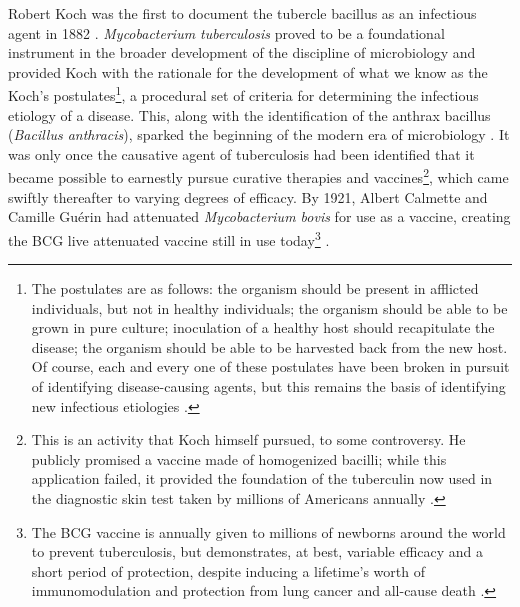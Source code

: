 Robert Koch was the first to document the tubercle bacillus as an infectious agent in 1882 \citep{Koch1882, Cambau2014}. \textit{Mycobacterium tuberculosis} proved to be a foundational instrument in the broader development of the discipline of microbiology and provided Koch with the rationale for the development of what we know as the Koch's postulates\footnote{The postulates are as follows: the organism should be present in afflicted individuals, but not in healthy individuals; the organism should be able to be grown in pure culture; inoculation of a healthy host should recapitulate the disease; the organism should be able to be harvested back from the new host. Of course, each and every one of these postulates have been broken in pursuit of identifying disease\hyp{}causing agents, but this remains the basis of identifying new infectious etiologies \citep{Segre2013}.}, a procedural set of criteria for determining the infectious etiology of a disease. This, along with the identification of the anthrax bacillus (\textit{Bacillus anthracis}), sparked the beginning of the modern era of microbiology \citep{Koch1876}. It was only once the causative agent of tuberculosis had been identified that it became possible to earnestly pursue curative therapies and vaccines\footnote{This is an activity that Koch himself pursued, to some controversy. He publicly promised a vaccine made of homogenized bacilli; while this application failed, it provided the foundation of the tuberculin now used in the diagnostic skin test taken by millions of Americans annually \citep{Goetz2014}.}, which came swiftly thereafter to varying degrees of efficacy. By 1921, Albert Calmette and Camille Gu\'{e}rin had attenuated \textit{Mycobacterium bovis} for use as a vaccine, creating the BCG live attenuated vaccine still in use today\footnote{The BCG vaccine is annually given to millions of newborns around the world to prevent tuberculosis, but demonstrates, at best, variable efficacy \citep{Schrager2020, Andersen2005, Rodrigues1993, Trauer2021} and a short period of protection, despite inducing a lifetime's worth of immunomodulation and protection from lung cancer and all\hyp{}cause death \citep{Higgins2016}.} \citep{Hawgood2007}. 

